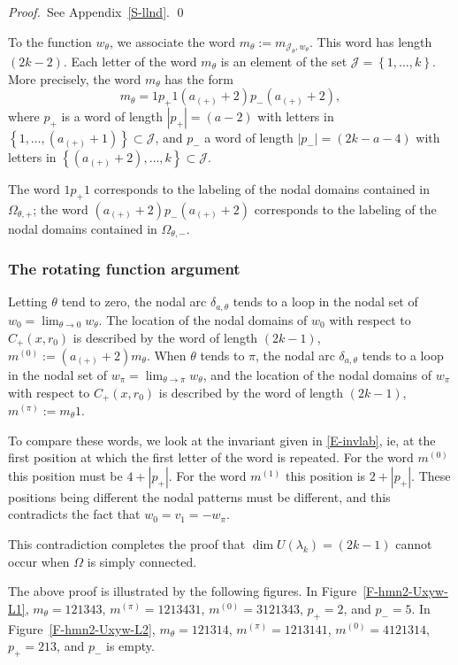 \documentclass[12pt,a4paper]{amsart}
\theoremstyle{plain} %
\theoremstyle{definition}
\numberwithin{equation}{section}
\numberwithin{figure}{section}
\numberwithin{table}{section}
\newcommand{\cJ}{\mathcal{J}}
\newcommand{\pf}{\emph{Proof.~}}
\newcommand{\set}[1]{\left\lbrace #1 \right\rbrace}
\begin{document}
{\pf See Appendix~\ref{S-llnd}. \hfill \qed\medskip

To the function $w_{\theta}$, we associate the word $m_{\theta} := m_{\cJ_{\theta},w_{\theta}}$. This word has length $(2k-2)$. Each letter of the word $m_{\theta}$ is an element of the set $\cJ = \set{1,\ldots,k}$. More precisely, the word $m_{\theta}$ has the form
%
$$m_{\theta} = 1p_{+}1(a_{(+)}+2)p_{-}(a_{(+)}+2),$$
%
where $p_{+}$ is a word of length $|p_{+}|=(a-2)$ with letters in $\set{1,\ldots,(a_{(+)}+1)} \subset \cJ$, and $p_{-}$ a word of length $|p_{-}|=(2k-a-4)$ with letters in $\set{(a_{(+)}+2),\ldots,k} \subset \cJ$.} The word $1p_{+}1$ corresponds to the labeling of the nodal domains contained in $\Omega_{\theta,+}$; the word $(a_{(+)}+2)p_{-}(a_{(+)}+2)$ corresponds to the labeling of the nodal domains contained in $\Omega_{\theta,-}$.


\subsubsection{The rotating function argument}\label{SSS-hmn-25D}

Letting $\theta$ tend to zero, the nodal arc $\delta_{a,\theta}$ tends to a loop in the nodal set of $w_0 = \lim_{\theta \to 0}w_{\theta}$. The  location of the nodal domains of $w_0$  with respect to $C_{+}(x,r_0)$ is  described by the word of length $(2k-1)$, $m^{(0)}:=(a_{(+)}+2)m_{\theta}$. When $\theta$ tends to $\pi$, the nodal arc $\delta_{a,\theta}$ tends to a loop in the nodal set of $w_{\pi} = \lim_{\theta \to \pi}w_{\theta}$, and   the location of the nodal domains of $w_{\pi}$  with respect to $C_{+}(x,r_0)$ is described by the word of length $(2k-1)$, $m^{(\pi)}:= m_{\theta}1$.\smallskip

To compare these words, we look  at the invariant given in \eqref{E-invlab}, ie, at the first position at which the first letter of the word is repeated. For the word $m^{(0)}$ this position must be $4 + |p_{+}|$. For the word $m^{(1)}$ this position is $2 + |p_{+}|$.  These positions being different the nodal patterns must be different, and this contradicts the fact that $w_0 = v_1 = - w_{\pi}$.\smallskip

This contradiction completes the proof that $\dim U(\lambda_k) = (2k-1)$ cannot occur  when $\Omega$ is simply connected. \medskip



The above proof is illustrated by the following figures. In Figure~\ref{F-hmn2-Uxyw-L1}, $m_{\theta} = 121343$, $m^{(\pi)} = 1213431$, $m^{(0)} = 3121343$, $p_{+} = 2$, and $p_{-} = 5$. In Figure~\ref{F-hmn2-Uxyw-L2}, $m_{\theta} = 121314$, $m^{(\pi)} = 1213141$, $m^{(0)} = 4121314$, $p_{+}= 213$, and $p_{-}$ is empty.
\end{document}
